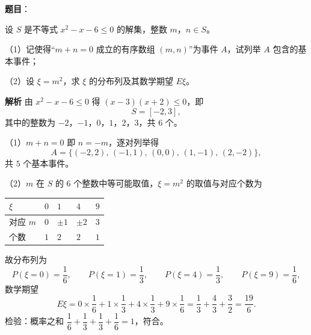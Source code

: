 \begin{answer}

\textbf{题目}：

设 $S$ 是不等式 $x^2-x-6\leqslant0$ 的解集，整数 $m$，$n\in S$。

（1）记使得“$m+n=0$ 成立的有序数组 $(m,n)$”为事件 $A$，试列举 $A$ 包含的基本事件；

（2）设 $\xi=m^2$，求 $\xi$ 的分布列及其数学期望 $E\xi$。

\textbf{解析}
由 $x^2-x-6\leqslant0$ 得 $(x-3)(x+2)\leqslant0$，即
\nopagebreak[4]
\[S=[-2,3],\]
其中的整数为 $-2$，$-1$，$0$，$1$，$2$，$3$，共 $6$ 个。

（1）$m+n=0$ 即 $n=-m$，逐对列举得
\nopagebreak[4]
\[A=\{(-2,2),\,(-1,1),\,(0,0),\,(1,-1),\,(2,-2)\},\]
共 $5$ 个基本事件。

（2）$m$ 在 $S$ 的 $6$ 个整数中等可能取值，$\xi=m^2$ 的取值与对应个数为

\begin{center}
\begin{tabular}{lllll}
\toprule
$\xi$ & $0$ & $1$ & $4$ & $9$ \\
\midrule
对应 $m$ & $0$ & $\pm1$ & $\pm2$ & $3$ \\
个数 & $1$ & $2$ & $2$ & $1$ \\
\bottomrule
\end{tabular}
\end{center}

故分布列为
\nopagebreak[4]
\[P(\xi=0)=\frac16,\qquad P(\xi=1)=\frac13,\qquad P(\xi=4)=\frac13,\qquad P(\xi=9)=\frac16,\]
数学期望
\nopagebreak[4]
\[E\xi=0\times\frac16+1\times\frac13+4\times\frac13+9\times\frac16
=\frac13+\frac43+\frac32=\frac{19}{6}.\]
检验：概率之和 $\dfrac16+\dfrac13+\dfrac13+\dfrac16=1$，符合。


\end{answer}
